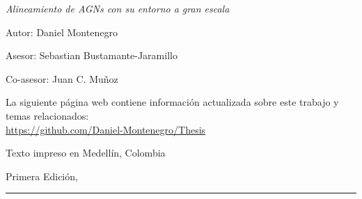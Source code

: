 
\thispagestyle{empty}

\hfill

\vfill

\medskip


\noindent
\textit{
Alineamiento de AGNs con su entorno a gran escala
}




Autor: Daniel Montenegro

Asesor: Sebastian Bustamante-Jaramillo 

Co-asesor: Juan C. Mu\~noz 



\vfill

\vfill

\noindent
La siguiente página web contiene información actualizada sobre este trabajo y temas relacionados: \\
\url{https://github.com/Daniel-Montenegro/Thesis}


\noindent
Texto impreso en Medellín, Colombia

\noindent
Primera Edici\'on, 
\monthname \ \the\year

\vspace{1cm}
\hrule
\bigskip

\cleardoublepage

%
%
%
%
%
%

